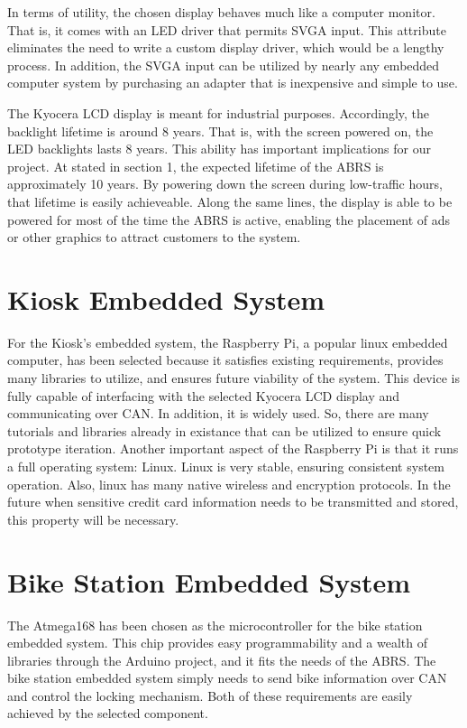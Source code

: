\documentclass[11pt,a4paper,onesides]{report}
\begin{document}
    In terms of utility, the chosen display behaves much like a computer monitor.  That is, it comes with an LED driver that permits SVGA input.  This attribute eliminates the need to write a custom display driver, which would be a lengthy process.  In addition, the SVGA input can be utilized by nearly any embedded computer system by purchasing an adapter that is inexpensive and simple to use.

    The Kyocera LCD display is meant for industrial purposes.  Accordingly, the backlight lifetime is around 8 years.  That is, with the screen powered on, the LED backlights lasts 8 years.  This ability has important implications for our project.  At stated in section 1, the expected lifetime of the ABRS is approximately 10 years.  By powering down the screen during low-traffic hours, that lifetime is easily achieveable.  Along the same lines, the display is able to be powered for most of the time the ABRS is active, enabling the placement of ads or other graphics to attract customers to the system.  

\section{Kiosk Embedded System}

For the Kiosk's embedded system, the Raspberry Pi, a popular linux embedded computer, has been selected because it satisfies existing requirements, provides many libraries to utilize, and ensures future viability of the system.  This device is fully capable of interfacing with the selected Kyocera LCD display and communicating over CAN.  In addition, it is widely used.  So, there are many tutorials and libraries already in existance that can be utilized to ensure quick prototype iteration.  Another important aspect of the Raspberry Pi is that it runs a full operating system: Linux.  Linux is very stable, ensuring consistent system operation.  Also, linux has many native wireless and encryption protocols.  In the future when sensitive credit card information needs to be transmitted and stored, this property will be necessary.  

\section{Bike Station Embedded System}

The Atmega168 has been chosen as the microcontroller for the bike station embedded system.  This chip provides easy programmability and a wealth of libraries through the Arduino project, and it fits the needs of the ABRS.  The bike station embedded system simply needs to send bike information over CAN and control the locking mechanism.  Both of these requirements are easily achieved by the selected component.  
\end{document}

